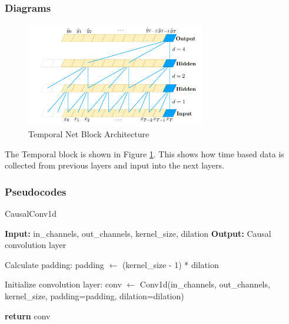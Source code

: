\documentclass[10pt]{article}
\begin{document}
\subsubsection{Diagrams}
\begin{figure}[H]
    \centering
    \includegraphics[width=0.7\textwidth]{temporal.png}
    \caption{Temporal Net Block Architecture}
    \label{fig:temporal_arch}
\end{figure}
The Temporal block is shown in Figure \ref{fig:temporal_arch}. This shows how time based data is collected from previous layers and input into the next layers.

\subsubsection{Pseudocodes}
\begin{algorithm}[H]
  \caption{CausalConv1d}
  \begin{algorithmic}[1]
      \State \textbf{Input:} in\_channels, out\_channels, kernel\_size, dilation
      \State \textbf{Output:} Causal convolution layer

      \State Calculate padding: padding $\gets$ (kernel\_size - 1) * dilation

      \State Initialize convolution layer: conv $\gets$ Conv1d(in\_channels, out\_channels, kernel\_size, padding=padding, dilation=dilation)

      \State \textbf{return} conv
    \EndProcedure
  \end{algorithmic}
\end{algorithm}
\end{document}
